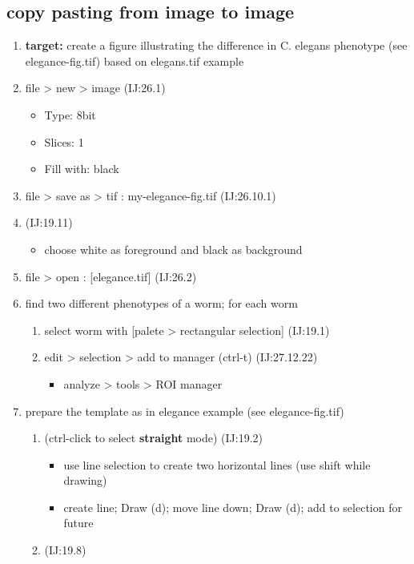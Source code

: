 \documentclass[11pt]{article}
\begin{document}
\subsection{copy pasting from image to image}
\label{sec-1-3}
\begin{enumerate}
\item \textbf{target:} create a figure illustrating the difference in C. elegans
phenotype (see elegance-fig.tif) based on elegans.tif example
\item file > new > image (IJ:26.1)
\begin{itemize}
\item Type: 8bit
\item Slices: 1
\item Fill with: black
\end{itemize}
\item file > save as > tif : my-elegance-fig.tif (IJ:26.10.1)
\item{} (IJ:19.11)
\begin{itemize}
\item choose white as foreground and black as background
\end{itemize}
\item file > open : [elegance.tif] (IJ:26.2)
\item find two different phenotypes of a worm; for each worm
\begin{enumerate}
\item select worm with [palete > rectangular selection]
(IJ:19.1)
\item edit > selection > add to manager (ctrl-t) (IJ:27.12.22)
\begin{itemize}
\item analyze > tools > ROI manager
\end{itemize}
\end{enumerate}
\item prepare the template as in elegance example (see elegance-fig.tif)
\begin{enumerate}
\item{} (ctrl-click to select \textbf{straight} mode) (IJ:19.2)
\begin{itemize}
\item use line selection to create two horizontal lines (use shift
while drawing)
\item create line; Draw (d); move line down; Draw (d); add to
selection for future
\end{itemize}
\item{} (IJ:19.8)

\end{enumerate}
\end{enumerate}
\end{document}
